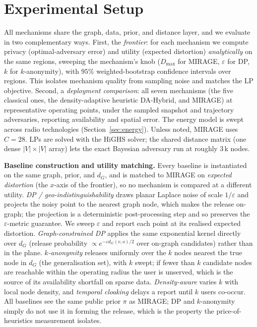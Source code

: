 \documentclass[10pt,journal,compsoc]{IEEEtran}
\newcommand{\dG}{d_{G}}
\begin{document}
\section{Experimental Setup}
\label{sec:setup}
All mechanisms share the graph, data, prior, and distance layer, and we evaluate in
two complementary ways. First, the \emph{frontier}: for each mechanism we compute
privacy (optimal-adversary error) and utility (expected distortion)
\emph{analytically} on the same regions, sweeping the mechanism's knob ($D_{\max}$
for MIRAGE, $\varepsilon$ for DP, $k$ for $k$-anonymity), with $95\%$
weighted-bootstrap confidence intervals over regions. This isolates mechanism
quality from sampling noise and matches the LP objective. Second, a \emph{deployment
comparison}: all seven mechanisms (the five classical ones, the density-adaptive
heuristic DA-Hybrid, and MIRAGE) at representative operating points, under the
sampled snapshot and trajectory adversaries, reporting availability and spatial
error. The energy model is swept across radio technologies
(Section~\ref{sec:energy}). Unless noted, MIRAGE uses $C{=}28$. LPs are solved with
the HiGHS solver; the shared distance matrix (one dense $|V|\times|V|$ array) lets
the exact Bayesian adversary run at roughly $3$\,k nodes.

\textbf{Baseline construction and utility matching.} Every baseline is instantiated
on the same graph, prior, and $\dG$, and is matched to MIRAGE on \emph{expected
distortion} (the $x$-axis of the frontier), so no mechanism is compared at a
different utility. \emph{DP / geo-indistinguishability} draws planar Laplace noise
of scale $1/\varepsilon$ and projects the noisy point to the nearest graph node,
which makes the release on-graph; the projection is a deterministic post-processing
step and so preserves the $\varepsilon$-metric guarantee. We sweep $\varepsilon$ and
report each point at its realised expected distortion. \emph{Graph-constrained DP}
applies the same exponential kernel directly over $\dG$ (release probability
$\propto e^{-\varepsilon \dG(v,o)/2}$ over on-graph candidates) rather than in the
plane. \emph{$k$-anonymity} releases uniformly over the $k$ nodes nearest the true
node in $\dG$ (the generalisation set), with $k$ swept; if fewer than $k$ candidate
nodes are reachable within the operating radius the user is unserved, which is the
source of its availability shortfall on sparse data. \emph{Density-aware} varies $k$
with local node density, and \emph{temporal cloaking} delays a report until $k$
users co-occur. All baselines see the same public prior $\pi$ as MIRAGE; DP and
$k$-anonymity simply do not use it in forming the release, which is the property the
price-of-heuristics measurement isolates.
\end{document}
